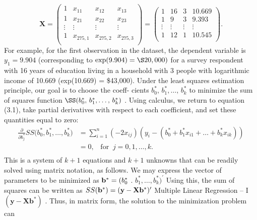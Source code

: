 \documentclass[11pt]{article}
\begin{document}
\[
\mathbf{X}=\left( \begin{matrix} {1} & {x_{1 1}} & {x_{1 2}} & {x_{1 3}} \\ {1} & {x_{2 1}} & {x_{2 2}} & {x_{2 3}} \\ {\vdots} & {\vdots} & {\vdots} & {\vdots} \\ {1} & {x_{2 7 5 , 1}} & {x_{2 7 5 , 2}} & {x_{2 7 5 , 3}} \\ \end{matrix} \right)=\left( \begin{matrix} {1} & {1 6} & {3} & {1 0 . 6 6 9} \\ {1} & {9} & {3} & {9 . 3 9 3} \\ {\vdots} & {\vdots} & {\vdots} & {\vdots} \\ {1} & {1 2} & {1} & {1 0 . 5 4 5} \\ \end{matrix} \right) .
\]
For example, for the first observation in the dataset, the dependent variable is
\(y_{1}=9 . 9 0 4\) (corresponding to \(\operatorname{e x p} ( 9 . 9 0 4 )=\S2 0 , 0 0 0 )\) for a survey respondent
with 16 years of education living in a household with 3 people with logarithmic
income of 10.669 (exp(10.669) = \$43,000).
Under the least squares estimation principle, our goal is to choose the coeff-
cients \(b_{0}^{\ast} , \, b_{1}^{\ast} , \dots, \, b_{k}^{\ast}\) to minimize the sum of squares function \(\SS( b_{0}^{\ast} , \, b_{1}^{\ast} , \ldots, \, b_{k}^{\ast} )\) .
Using calculus, we return to equation (3.1), take partial derivatives with respect
to each coefficient, and set these quantities equal to zero:
\[
\begin{aligned} {\frac{\partial} {\partial b_{j}^{*}} S S \big( b_{0}^{*} , b_{1}^{*} , \dots, b_{k}^{*} \big)} & {{}=\sum_{i=1}^{n} (-2 x_{i j} ) \left( y_{i}-\left( b_{0}^{*}+b_{1}^{*} x_{i 1}+\dots+b_{k}^{*} x_{i k} \right) \right)} \\ {} & {{}=0 , \; \; \; \mathrm{f o r} \; \; j=0 , 1 , \dots, k .} \\ \end{aligned}
\]
This is a system of \(k+1\) equations and \(k+1\) unknowns that can be readily
 solved using matrix notation, as follows.
We may express the vector of parameters to be minimized as \({\bf b}^{*}=( b_{0}^{*}\) .
\(b_{1}^{*} , \dots, b_{k}^{*} )^{\prime}\) Using this, the sum of squares can be written as \(S S ( {\bf b^{*}} )=( {\bf y}-{\bf X b^{*}} )^{\prime}\)
 Multiple Linear Regression -- I
\(( \mathbf{y}-\mathbf{X b}^{*} )\) . Thus, in matrix form, the solution to the minimization problem can
\end{document}
